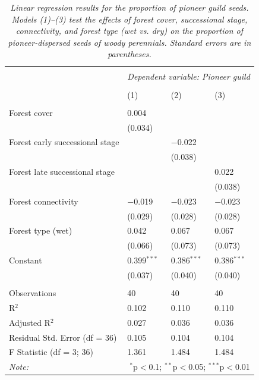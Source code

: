 \newpage
\begin{table}[H]
\centering
\scriptsize %
\caption{\textit{Linear regression results for the proportion of pioneer guild seeds. Models (1)–(3) test the effects of forest cover, successional stage, connectivity, and forest type (wet vs. dry) on the proportion of pioneer-dispersed seeds of woody perennials. Standard errors are in parentheses.}}
\begin{tabularx}{\textwidth}{@{\extracolsep{3pt}}lXXX} 
\\[-1ex]\hline 
\hline \\[-1ex] 
 & \multicolumn{3}{c}{\textit{Dependent variable: Pioneer guild}} \\ 
\\[-1ex] & (1) & (2) & (3)\\ 
\hline \\[-0.8ex] 
Forest cover & 0.004 &  &  \\ 
 & (0.034) &  &  \\ 
Forest early successional stage &  & $-$0.022 &  \\ 
 &  & (0.038) &  \\ 
Forest late successional stage &  &  & 0.022 \\ 
 &  &  & (0.038) \\ 
Forest connectivity & $-$0.019 & $-$0.023 & $-$0.023 \\ 
 & (0.029) & (0.028) & (0.028) \\ 
Forest type (wet) & 0.042 & 0.067 & 0.067 \\ 
 & (0.066) & (0.073) & (0.073) \\ 
Constant & 0.399$^{***}$ & 0.386$^{***}$ & 0.386$^{***}$ \\ 
 & (0.037) & (0.040) & (0.040) \\ 
\hline \\[-0.8ex] 
Observations & 40 & 40 & 40 \\ 
R$^{2}$ & 0.102 & 0.110 & 0.110 \\ 
Adjusted R$^{2}$ & 0.027 & 0.036 & 0.036 \\ 
Residual Std. Error (df = 36) & 0.105 & 0.104 & 0.104 \\ 
F Statistic (df = 3; 36) & 1.361 & 1.484 & 1.484 \\ 
\hline 
\textit{Note:} & \multicolumn{3}{r}{$^{*}$p$<$0.1; $^{**}$p$<$0.05; $^{***}$p$<$0.01} \\ 
\end{tabularx} 
\label{tab:pioneer}
\end{table} 

